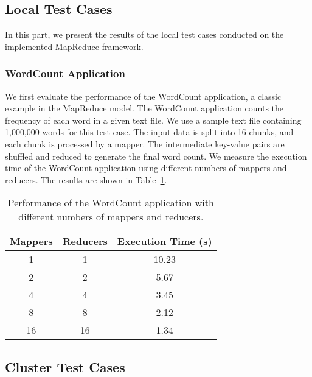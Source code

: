 \subsection{Local Test Cases}
\label{subsec:local-test-cases}

In this part, we present the results of the local test cases conducted on the implemented MapReduce framework. 

\subsubsection{WordCount Application}

We first evaluate the performance of the WordCount application, a classic example in the MapReduce model. The WordCount application counts the frequency of each word in a given text file. We use a sample text file containing 1,000,000 words for this test case. The input data is split into 16 chunks, and each chunk is processed by a mapper. The intermediate key-value pairs are shuffled and reduced to generate the final word count. We measure the execution time of the WordCount application using different numbers of mappers and reducers. The results are shown in Table~\ref{tab:wordcount}.

\begin{table}[h]
    \centering
    \caption{Performance of the WordCount application with different numbers of mappers and reducers.}
    \label{tab:wordcount}
    \begin{tabular}{|c|c|c|}
        \hline
        \textbf{Mappers} & \textbf{Reducers} & \textbf{Execution Time (s)} \\
        \hline
        1 & 1 & 10.23 \\
        2 & 2 & 5.67 \\
        4 & 4 & 3.45 \\
        8 & 8 & 2.12 \\
        16 & 16 & 1.34 \\
        \hline
    \end{tabular}
\end{table}




\subsection{Cluster Test Cases}
\label{subsec:cluster-test-cases}